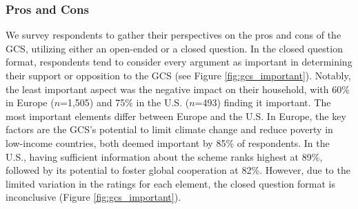   


\subsubsection{Pros and Cons}\label{subsubsec:pros_cons}

We survey respondents to gather their perspectives on the pros and cons of the GCS, utilizing either an open-ended or a closed question. In the closed question format, respondents tend to consider every argument as important in determining their support or opposition to the GCS (see Figure \ref{fig:gcs_important}). Notably, the least important aspect was the negative impact on their household, with 60\% in Europe ($n$=1,505) and 75\% in the U.S. ($n$=493) finding it important. The most important elements differ between Europe and the U.S. In Europe, the key factors are the GCS's potential to limit climate change and reduce poverty in low-income countries, both deemed important by 85\% of respondents. In the U.S., having sufficient information about the scheme ranks highest at 89\%, followed by its potential to foster global cooperation at 82\%. However, due to the limited variation in the ratings for each element, the closed question format is inconclusive (Figure \ref{fig:gcs_important}). %


